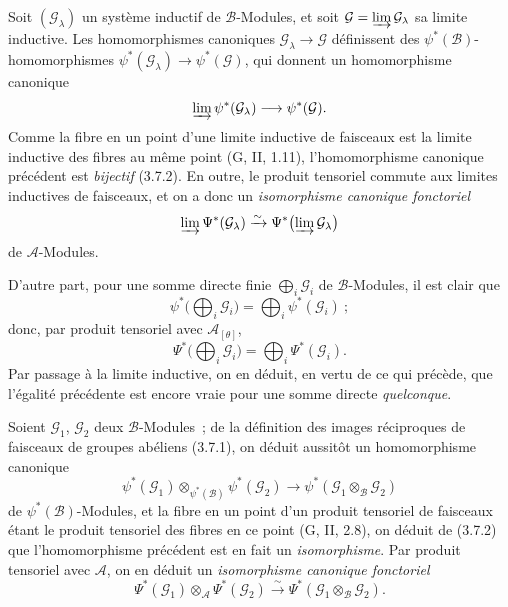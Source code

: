 \begin{env}[4.3.2]
\label{0.4.3.2-fr}
Soit $(\mathcal{G}_\lambda)$ un système inductif de $\mathcal{B}$-Modules, et
soit $\mathcal{G}=\varinjlim\mathcal{G}_\lambda$ sa limite inductive. Les
homomorphismes canoniques $\mathcal{G}_\lambda\to\mathcal{G}$ définissent des
$\psi^*(\mathcal{B})$-homomorphismes
$\psi^*(\mathcal{G}_\lambda)\to\psi^*(\mathcal{G})$, qui donnent un
homomorphisme canonique
\[
  \varinjlim\psi^*(\mathcal{G}_\lambda)
  \longrightarrow
  \psi^*(\mathcal{G}).
\]
Comme la fibre en un point d'une limite inductive de faisceaux est la limite
inductive des fibres au même point (G, II, 1.11), l'homomorphisme canonique
précédent est \emph{bijectif} (3.7.2). En outre, le produit tensoriel commute
aux limites inductives de faisceaux, et on a donc un \emph{isomorphisme
canonique fonctoriel}
\[
  \varinjlim\Psi^*(\mathcal{G}_\lambda)
  \xrightarrow{\sim}
  \Psi^*\bigl(\varinjlim\mathcal{G}_\lambda\bigr)
\]
de $\mathcal{A}$-Modules.

D'autre part, pour une somme directe finie $\bigoplus_i\mathcal{G}_i$ de
$\mathcal{B}$-Modules, il est clair que
\[
  \psi^*\bigl(\bigoplus_i\mathcal{G}_i\bigr)
  =\bigoplus_i\psi^*(\mathcal{G}_i)~;
\]
donc, par produit tensoriel avec $\mathcal{A}_{[\theta]}$,
\[
  \Psi^*\bigl(\bigoplus_i\mathcal{G}_i\bigr)
  =\bigoplus_i\Psi^*(\mathcal{G}_i).
  \tag{4.3.2.1}\label{0.4.3.2.1-fr}
\]
Par passage à la limite inductive, on en déduit, en vertu de ce qui précède,
que l'égalité précédente est encore vraie pour une somme directe
\emph{quelconque}.
\end{env}

\begin{env}[4.3.3]
\label{0.4.3.3-fr}
Soient $\mathcal{G}_1$, $\mathcal{G}_2$ deux $\mathcal{B}$-Modules~; de la
définition des images réciproques de faisceaux de groupes abéliens (3.7.1),
on déduit aussitôt un homomorphisme canonique
\[
  \psi^*(\mathcal{G}_1)\otimes_{\psi^*(\mathcal{B})}\psi^*(\mathcal{G}_2)
  \longrightarrow
  \psi^*(\mathcal{G}_1\otimes_{\mathcal{B}}\mathcal{G}_2)
\]
de $\psi^*(\mathcal{B})$-Modules, et la fibre en un point d'un produit
tensoriel de faisceaux étant le produit tensoriel des fibres en ce point
(G, II, 2.8), on déduit de (3.7.2) que l'homomorphisme précédent est en fait
un \emph{isomorphisme}. Par produit tensoriel avec $\mathcal{A}$, on en déduit
un \emph{isomorphisme canonique fonctoriel}
\[
  \Psi^*(\mathcal{G}_1)\otimes_{\mathcal{A}}\Psi^*(\mathcal{G}_2)
  \xrightarrow{\sim}
  \Psi^*(\mathcal{G}_1\otimes_{\mathcal{B}}\mathcal{G}_2).
  \tag{4.3.3.1}\label{0.4.3.3.1-fr}
\]
\end{env}

